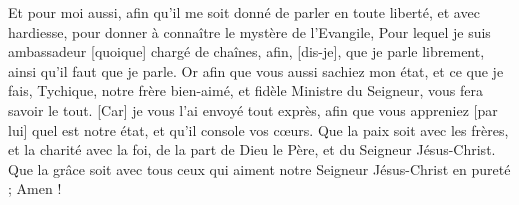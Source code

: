\begin{multicols}{2}
Et pour moi aussi, afin qu'il me soit donné de parler en toute liberté, et avec hardiesse, pour donner à connaître le mystère de l'Evangile,
Pour lequel je suis ambassadeur [quoique] chargé de chaînes, afin, [dis-je], que je parle librement, ainsi qu'il faut que je parle.
Or afin que vous aussi sachiez mon état, et ce que je fais, Tychique, notre frère bien-aimé, et fidèle Ministre du Seigneur, vous fera savoir le tout.
[Car] je vous l'ai envoyé tout exprès, afin que vous appreniez [par lui] quel est notre état, et qu'il console vos cœurs.
Que la paix soit avec les frères, et la charité avec la foi, de la part de Dieu le Père, et du Seigneur Jésus-Christ.
Que la grâce soit avec tous ceux qui aiment notre Seigneur Jésus-Christ en pureté ; Amen !
\PPE{}
\end{multicols}
